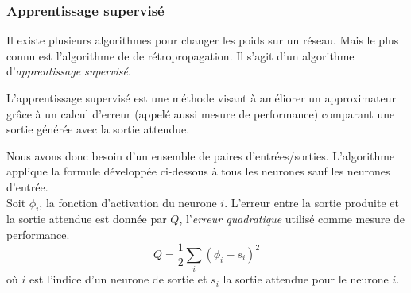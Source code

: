 \subsubsection{Apprentissage supervisé}\label{sec:appmlp}
Il existe plusieurs algorithmes pour changer les poids sur un réseau. Mais le plus connu est l'algorithme de de rétropropagation.\cite{Haykin,Gauthier}
Il s'agit d'un algorithme d'\emph{apprentissage supervisé}.
\begin{definition}
L'apprentissage supervisé est une méthode visant à améliorer un approximateur grâce à un calcul d'erreur (appelé aussi mesure de performance\cite{Gauthier}) comparant une sortie générée avec la sortie attendue.
\end{definition}
Nous avons donc besoin d'un ensemble de paires d'entrées/sorties.
L'algorithme applique la formule développée ci-dessous à tous les neurones sauf les neurones d'entrée.\\

Soit $\phi_i$, la fonction d'activation du neurone $i$. L'erreur entre la sortie produite et la sortie attendue est donnée par $Q$, l'\emph{erreur quadratique} utilisé comme mesure de performance.
\begin{equation} \label{eq:Q}
 Q = \frac{1}{2}\sum_{i}(\phi_i-s_i)^2
\end{equation}
où $i$ est l'indice d'un neurone de sortie et $s_i$ la sortie attendue pour le neurone $i$.

